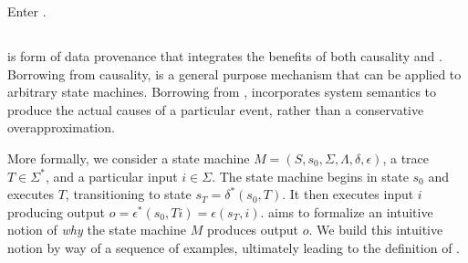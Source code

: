 Enter \watprovenance{}.

%


\subsection{\WatProvenance{}}
\Watprovenance{} is form of data provenance that integrates the benefits of
both causality and \whyprovenance{}. Borrowing from causality, \watprovenance{}
is a general purpose mechanism that can be applied to arbitrary state machines.
Borrowing from \whyprovenance{}, \watprovenance{} incorporates system semantics
to produce the actual causes of a particular event, rather than a conservative
overapproximation.

More formally, we consider a state machine $M = (S, s_0, \Sigma, \Lambda,
\delta, \epsilon)$, a trace $T \in \Sigma^*$, and a particular input $i \in
\Sigma$. The state machine begins in state $s_0$ and executes $T$,
transitioning to state $s_T = \delta^*(s_0, T)$. It then executes input $i$
producing output $o = \epsilon^*(s_0, Ti) = \epsilon(s_T, i)$. \Watprovenance{}
aims to formalize an intuitive notion of \emph{why} the state machine $M$
produces output $o$. We build this intuitive notion by way of a sequence of
examples, ultimately leading to the definition of \watprovenance{}.

